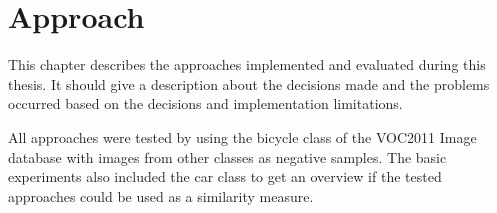 \chapter{Approach}
\label{cha:work}

This chapter describes the approaches implemented and evaluated during this thesis. It should give a description about the decisions made and the problems occurred based on the decisions and implementation limitations.

All approaches were tested by using the bicycle class of the \ac{VOC2011} Image database \cite{Pascal2011} with images from other classes as negative samples. The basic experiments also included the car class to get an overview if the tested approaches could be used as a similarity measure.















